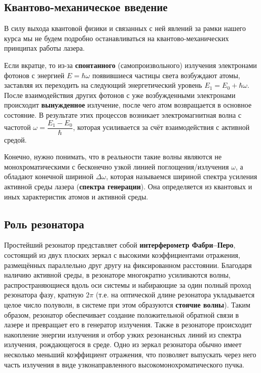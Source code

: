 \documentclass[12pt]{kiarticle}
\begin{document}
\subsection{Квантово-механическое введение}

В силу выхода квантовой физики и связанных с ней явлений за рамки нашего курса мы не будем подробно останавливаться на квантово-механических принципах работы лазера.

Если вкратце, то из-за \textbf{спонтанного} (самопроизвольного) излучения электронами фотонов с энергией $ E = \hbar \omega $ появившиеся частицы света возбуждают атомы, заставляя их переходить на следующий энергетический уровень $ E_1 = E_0 + \hbar \omega $. После взаимодействия других фотонов с уже возбужденными электронами происходит \textbf{вынужденное} излучение, после чего атом возвращается в основное состояние. В результате этих процессов возникает электромагнитная волна с частотой $ \omega = \dfrac{E_1 - E_0}{\hbar} $, которая усиливается за счёт взаимодействия с активной средой.  

Конечно, нужно понимать, что в реальности такие волны являются не монохроматическими с бесконечно узкой линией поглощения/излучения $ \omega $, а обладают конечной шириной $ \Delta \omega $, которая называемся шириной спектра усиления активной среды лазера (\textbf{спектра генерации}). Она определяется из квантовых и иных характеристик атомов и активной среды. 

\subsection{Роль резонатора}

Простейший резонатор представляет собой \textbf{интерферометр
Фабри–Перо}, состоящий из двух плоских зеркал с
высокими коэффициентами отражения, размещённых параллельно друг другу на фиксированном расстоянии. Благодаря наличию
активной среды, в резонаторе многократно усиливаются волны, распространяющиеся вдоль оси системы и набирающие за один полный
проход резонатора фазу, кратную $ 2\pi $ (т.е. на оптической длине резонатора укладывается целое число полуволн, в системе при этом
образуются \textbf{стоячие волны}). Таким образом, резонатор обеспечивает
создание положительной обратной связи в лазере и превращает его
в генератор излучения. Также в резонаторе происходит накопление
энергии излучения и отбор узких резонансных линий из спектра
излучения, рождающегося в среде. Одно из зеркал резонатора обычно
имеет несколько меньший коэффициент отражения, что позволяет
выпускать через него часть излучения в виде узконаправленного
высокомонохроматического пучка.
\end{document}
